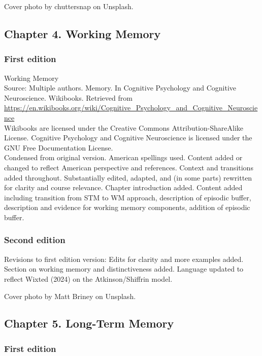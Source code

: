 \documentclass[
]{krantz}
\begin{document}
Cover photo by chuttersnap on Unsplash.

\subsection*{Chapter 4. Working Memory}\label{chapter-4.-working-memory}


\subsubsection*{First edition}\label{first-edition-4}


Working Memory\\
Source: Multiple authors. Memory. In Cognitive Psychology and Cognitive Neuroscience. Wikibooks. Retrieved from \url{https://en.wikibooks.org/wiki/Cognitive_Psychology_and_Cognitive_Neuroscience}\\
Wikibooks are licensed under the Creative Commons Attribution-ShareAlike License.
Cognitive Psychology and Cognitive Neuroscience is licensed under the GNU Free Documentation License.\\
Condensed from original version. American spellings used. Content added or changed to reflect American perspective and references. Context and transitions added throughout. Substantially edited, adapted, and (in some parts) rewritten for clarity and course relevance. Chapter introduction added. Content added including transition from STM to WM approach, description of episodic buffer, description and evidence for working memory components, addition of episodic buffer.

\subsubsection*{Second edition}\label{second-edition-4}


Revisions to first edition version: Edits for clarity and more examples added. Section on working memory and distinctiveness added. Language updated to reflect Wixted (2024) on the Atkinson/Shiffrin model.

Cover photo by Matt Briney on Unsplash.

\subsection*{Chapter 5. Long-Term Memory}\label{chapter-5.-long-term-memory}


\subsubsection*{First edition}\label{first-edition-5}
\end{document}
